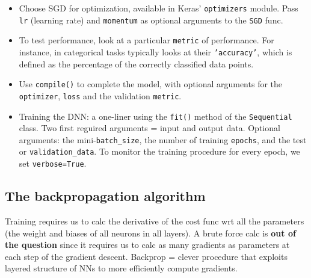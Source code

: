 \documentclass[norsk,a4paper,11pt]{article}
\begin{document}
\begin{itemize}
	\item Choose SGD for optimization, available in Keras' \texttt{optimizers} module. Pass \texttt{lr} (learning rate) and \texttt{momentum} as optional arguments to the \texttt{SGD} func.
	\item To test performance, look at a particular \texttt{metric} of performance. For instance, in categorical tasks typically looks at their \texttt{'accuracy'}, which is defined as the percentage of the correctly classified data points.
	\item Use \texttt{compile()} to complete the model, with optional arguments for the \texttt{optimizer}, \texttt{loss} and the validation \texttt{metric}.
	\item Training the DNN: a one-liner using the \texttt{fit()} method of the \texttt{Sequential} class. Two first reguired arguments = input and output data. Optional arguments: the mini-\texttt{batch\_size}, the number of training \texttt{epochs}, and the test or \texttt{validation\_data}. To monitor the training procedure for every epoch, we set \texttt{verbose=True}.
\end{itemize}


\subsection{The backpropagation algorithm}
Training requires us to calc the derivative of the cost func wrt all the parameters (the weight and biases of all neurons in all layers). A brute force calc is \textbf{out of the question} since it requires us to calc as many gradients as parameters at each step of the gradient descent. Backprop = clever procedure that exploits layered structure of NNs to more efficiently compute gradients.
\end{document}
